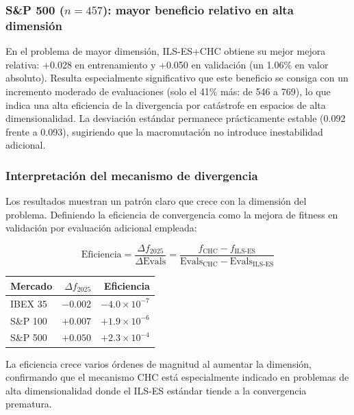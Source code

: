 \subsubsection*{S\&P 500 ($n=457$): mayor beneficio relativo en alta dimensión}

En el problema de mayor dimensión, ILS-ES+CHC obtiene su mejor mejora relativa: +0.028 en
entrenamiento y +0.050 en validación (un 1.06\% en valor absoluto). Resulta especialmente
significativo que este beneficio se consiga con un incremento moderado de evaluaciones (solo el
41\% más: de 546 a 769), lo que indica una alta eficiencia de la divergencia por catástrofe en
espacios de alta dimensionalidad. La desviación estándar permanece prácticamente estable (0.092
frente a 0.093), sugiriendo que la macromutación no introduce inestabilidad adicional.

\subsubsection*{Interpretación del mecanismo de divergencia}

Los resultados muestran un patrón claro que crece con la dimensión del problema. Definiendo la
eficiencia de convergencia como la mejora de fitness en validación por evaluación adicional empleada:

\begin{equation}
\text{Eficiencia} = \frac{\Delta f_{\text{2025}}}{\Delta \text{Evals}} =
\frac{f_{\text{CHC}} - f_{\text{ILS-ES}}}{\text{Evals}_{\text{CHC}} - \text{Evals}_{\text{ILS-ES}}}
\end{equation}

\begin{center}
\begin{tabular}{lrr}
\hline
Mercado  & $\Delta f_{\text{2025}}$ & Eficiencia \\
\hline
IBEX 35  & $-0.002$ & $-4.0 \times 10^{-7}$ \\
S\&P 100 & $+0.007$ & $+1.9 \times 10^{-6}$ \\
S\&P 500 & $+0.050$ & $+2.3 \times 10^{-4}$ \\
\hline
\end{tabular}
\end{center}

La eficiencia crece varios órdenes de magnitud al aumentar la dimensión, confirmando que el
mecanismo CHC está especialmente indicado en problemas de alta dimensionalidad donde el ILS-ES
estándar tiende a la convergencia prematura.

